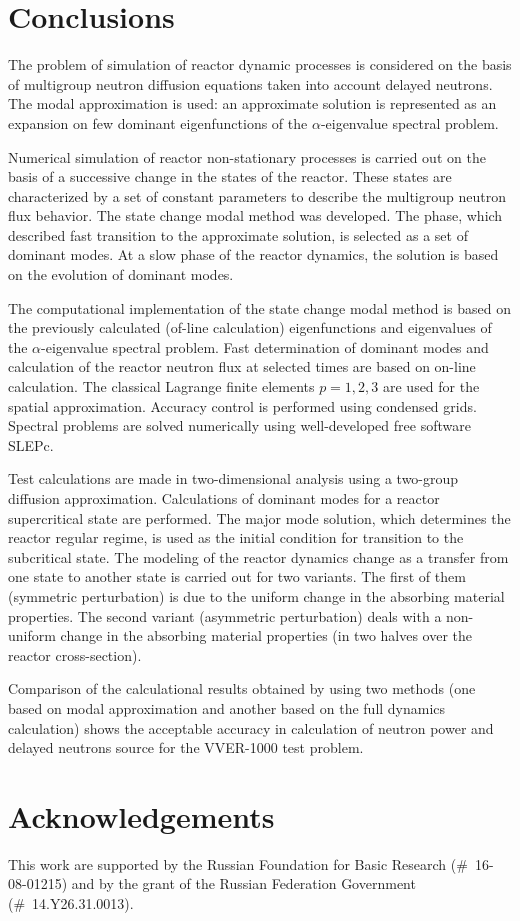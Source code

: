 \documentclass[authoryear]{elsarticle}
\begin{document}
\section{Conclusions} 

The problem of simulation of reactor dynamic processes is considered on the basis of multigroup neutron diffusion equations taken into account delayed neutrons.
The modal approximation is used: an approximate solution is represented as an expansion on few dominant eigenfunctions of the $\alpha$-eigenvalue spectral problem.

Numerical simulation of reactor non-stationary processes is carried out on the basis of a successive change in the states of the reactor. These states are characterized by a set of constant parameters to describe the multigroup neutron flux behavior.
The state change modal method was developed. The phase, which described fast transition to the approximate solution, is selected as a set of dominant modes. At a slow phase of the reactor dynamics, the solution is based on the evolution of dominant modes.

The computational implementation of the state change modal method is based on the previously calculated (of-line calculation) eigenfunctions and eigenvalues of the  $\alpha$-eigenvalue spectral problem. Fast determination of dominant modes and calculation of the reactor neutron flux at selected times are based on on-line calculation.
The classical Lagrange finite elements $p=1,2,3$ are used for the spatial approximation. 
Accuracy control is performed using condensed grids. Spectral problems are solved numerically using well-developed free software SLEPc.

Test calculations are made in two-dimensional analysis using a two-group diffusion approximation. Calculations of dominant modes for a reactor supercritical state are performed. The major mode solution, which determines the reactor regular regime, is used as the initial condition for transition to the subcritical state. The modeling of the reactor dynamics change as a transfer from one state to another state is carried out for two variants. The first of them (symmetric perturbation) is due to the uniform change in the absorbing material properties. The second variant (asymmetric perturbation) deals with a non-uniform change in the absorbing material properties (in two halves over the reactor cross-section).

Comparison of the calculational results obtained by using two methods (one based on modal approximation and another based on the full dynamics calculation) shows the acceptable accuracy in calculation of neutron power and delayed neutrons source for the VVER-1000 test problem.

\section*{Acknowledgements}

This work are supported by the Russian Foundation for Basic Research (\#~16-08-01215) 
and by the grant of the Russian Federation Government (\#~14.Y26.31.0013).

\clearpage


\end{document}

